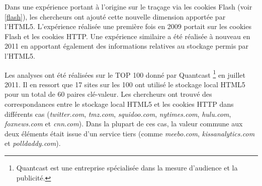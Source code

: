 Dans une expérience portant à l'origine sur le traçage via les cookies Flash \cite{flash_cookies_privacy_2} (voir \autoref{flash}), les chercheurs ont ajouté cette nouvelle dimension apportée par l'HTML5.
L'expérience réalisée une première fois en 2009 portait sur les cookies Flash et les cookies HTTP. Une expérience similaire a été réalisée à nouveau en 2011 en apportant également des informations relatives au stockage permis par l'HTML5.
\newline

Les analyses ont été réalisées sur le TOP 100 donné par Quantcast \footnote{Quantcast est une entreprise spécialisée dans la mesure d'audience et la publicité.} en juillet 2011.
Il en ressort que 17 sites sur les 100 ont utilisé le stockage local HTML5 pour un total de 60 paires clé-valeur. Les chercheurs ont trouvé des correspondances entre le stockage local HTML5 et les cookies HTTP dans différents cas (\textit{twitter.com}, \textit{tmz.com}, \textit{squidoo.com}, \textit{nytimes.com}, \textit{hulu.com}, \textit{foxnews.com} et \textit{cnn.com}). Dans la plupart de ces cas, la valeur commune aux deux éléments était issue d'un service tiers (comme \textit{meebo.com}, \textit{kissanalytics.com} et \textit{polldaddy.com}).

